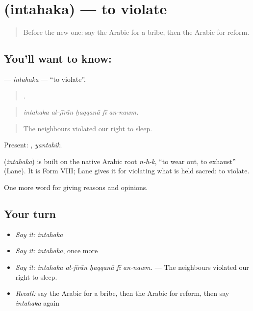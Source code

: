 \section[\texorpdfstring{\ar{انتهك} (intahaka)}{انتهك (intahaka)}]{ (intahaka) — to violate}

\label{lesson:AR-C388-intahaka}



\begin{quote}
Before the new one: say the Arabic for a bribe, then the Arabic for reform.
\end{quote}

\subsection*{You'll want to know: }
\textbf{} — \emph{intahaka} — \textquotedblleft{}to violate\textquotedblright{}.

\begin{quote}
    .
\end{quote}

\begin{quote}
\emph{intahaka al-jīrān ḥaqqanā fī an-nawm.}
\end{quote}

\begin{quote}
The neighbours violated our right to sleep.
\end{quote}

Present: , \emph{yantahik}.

\begin{cousinweb}
\textbf{} (\emph{intahaka}) is built on the native Arabic root \emph{n-h-k}, \textquotedblleft{}to wear out, to exhaust\textquotedblright{} (Lane). It is Form VIII; Lane gives it for violating what is held sacred: to violate.
\end{cousinweb}

\begin{grammarlens}[title={What you've built}]
One more word for giving reasons and opinions.
\end{grammarlens}

\subsection*{Your turn}
\begin{itemize}
\raggedright
  \item \emph{Say it:} \emph{intahaka}
  \item \emph{Say it:} \emph{intahaka}, once more
  \item \emph{Say it:} \emph{intahaka al-jīrān ḥaqqanā fī an-nawm.} — The neighbours violated our right to sleep.
  \item \emph{Recall:} say the Arabic for a bribe, then the Arabic for reform, then say \emph{intahaka} again
\end{itemize}

